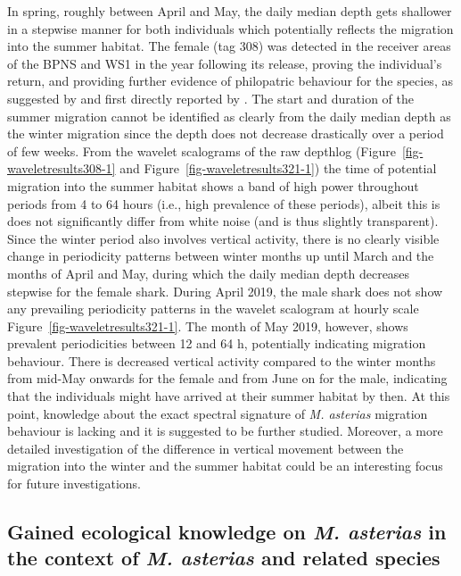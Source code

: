 \documentclass[
  authoryear,
  review,
  3p]{elsarticle}
\begin{document}
In spring, roughly between April and May, the daily median depth gets
shallower in a stepwise manner for both individuals which potentially
reflects the migration into the summer habitat. The female (tag 308) was
detected in the receiver areas of the BPNS and WS1 in the year following
its release, proving the individual's return, and providing further
evidence of philopatric behaviour for the species, as suggested by
\citet{breve_2016} and first directly reported by
\citet{griffiths_2020}. The start and duration of the summer migration
cannot be identified as clearly from the daily median depth as the
winter migration since the depth does not decrease drastically over a
period of few weeks. From the wavelet scalograms of the raw depthlog
(Figure~\ref{fig-waveletresults308-1} and
Figure~\ref{fig-waveletresults321-1}) the time of potential migration
into the summer habitat shows a band of high power throughout periods
from 4 to 64 hours (i.e., high prevalence of these periods), albeit this
is does not significantly differ from white noise (and is thus slightly
transparent). Since the winter period also involves vertical activity,
there is no clearly visible change in periodicity patterns between
winter months up until March and the months of April and May, during
which the daily median depth decreases stepwise for the female shark.
During April 2019, the male shark does not show any prevailing
periodicity patterns in the wavelet scalogram at hourly scale
Figure~\ref{fig-waveletresults321-1}. The month of May 2019, however,
shows prevalent periodicities between 12 and 64 h, potentially
indicating migration behaviour. There is decreased vertical activity
compared to the winter months from mid-May onwards for the female and
from June on for the male, indicating that the individuals might have
arrived at their summer habitat by then. At this point, knowledge about
the exact spectral signature of \emph{M. asterias} migration behaviour
is lacking and it is suggested to be further studied. Moreover, a more
detailed investigation of the difference in vertical movement between
the migration into the winter and the summer habitat could be an
interesting focus for future investigations.

\hypertarget{gained-ecological-knowledge-on-m.-asterias-in-the-context-of-m.-asterias-and-related-species}{%
\subsection{\texorpdfstring{Gained ecological knowledge on \emph{M.
asterias} in the context of \emph{M. asterias} and related
species}{Gained ecological knowledge on M. asterias in the context of M. asterias and related species}}\label{gained-ecological-knowledge-on-m.-asterias-in-the-context-of-m.-asterias-and-related-species}}
\end{document}
